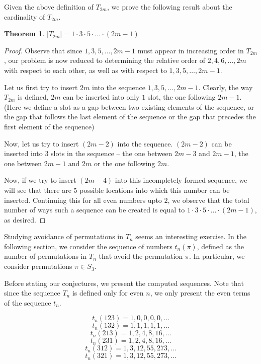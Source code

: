 \documentclass[11pt,letterpaper,twoside,english]{article}
\theoremstyle{theorem}
\newtheorem{theorem}{Theorem}
\theoremstyle{remark}
\begin{document}
Given the above definition of $T_{2m}$, we prove the following result about the cardinality of $T_{2m}$.

\begin{theorem}
$|T_{2m}| = 1 \cdot 3 \cdot 5 \cdot \ldots \cdot (2m-1)$
\end{theorem}

\begin{proof}
Observe that since $1,3,5,\ldots,2m-1$ must appear in increasing order in $T_{2m}$, our problem is now reduced to determining the relative order of $2,4,6,\ldots,2m$ with respect to each other, as well as with respect to $1,3,5,\ldots,2m-1$.

Let us first try to insert $2m$ into the sequence $1,3,5,\ldots,2m-1$. Clearly, the way $T_{2m}$ is defined, $2m$ can be inserted into only $1$ slot, the one following $2m-1$. (Here we define a slot as a gap between two existing elements of the sequence, or the gap that follows the last element of the sequence or the gap that precedes the first element of the sequence)

Now, let us try to insert $(2m-2)$ into the sequence. $(2m-2)$ can be inserted into $3$ slots in the sequence -- the one between $2m-3$ and $2m-1$, the one between $2m-1$ and $2m$ or the one following $2m$.

Now, if we try to insert $(2m-4)$ into this incompletely formed sequence, we will see that there are $5$ possible locations into which this number can be inserted. Continuing this for all even numbers upto $2$, we observe that the total number of ways such a sequence can  be created is equal to $1 \cdot 3 \cdot 5 \cdot \ldots \cdot (2m-1)$, as desired.
\end{proof}

Studying avoidance of permutations in $T_n$ seems an interesting exercise. In the following section, we consider the sequence of numbers $t_n(\pi)$, defined as the number of permutations in $T_n$ that avoid the permutation $\pi$. In particular, we consider permutations $\pi \in S_3$.

Before stating our conjectures, we present the computed sequences. Note that since the sequence $T_n$ is defined only for even $n$, we only present the even terms of the sequence $t_n$.

$$t_n(123) = 1, 0, 0, 0, 0, \ldots$$
$$t_n(132) = 1, 1, 1, 1, 1, \ldots$$
$$t_n(213) = 1, 2, 4, 8, 16, \ldots$$
$$t_n(231) = 1, 2, 4, 8, 16, \ldots$$
$$t_n(312) = 1, 3, 12, 55, 273, \ldots$$
$$t_n(321) = 1, 3, 12, 55, 273, \ldots$$
\end{document}
